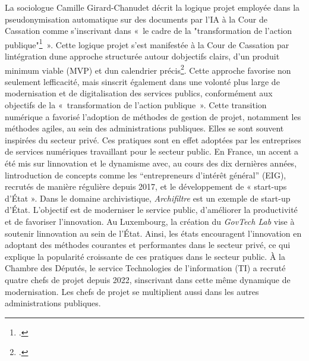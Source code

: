  La sociologue Camille Girard-Chanudet décrit la logique projet employée dans
la pseudonymisation automatique sur des documents par l'IA à la Cour de
Cassation comme s'inscrivant dans «~le cadre de la "transformation de
l'action publique"\footcite{girard-chanudet_travail_2023}~». Cette logique projet s'est
manifestée à la Cour de Cassation par l\textquotesingle intégration
d\textquotesingle une approche structurée autour
d\textquotesingle objectifs clairs, d'un produit minimum viable (MVP) et
d\textquotesingle un calendrier précis\footcite{girard-chanudet_travail_2023}. Cette
approche favorise non seulement l\textquotesingle efficacité, mais
s\textquotesingle inscrit également dans une volonté plus large de
modernisation et de digitalisation des services publics, conformément
aux objectifs de la «~transformation de l'action publique~». Cette
transition numérique a favorisé l'adoption de méthodes de gestion de
projet, notamment les méthodes agiles, au sein des administrations
publiques. Elles se sont souvent inspirées du secteur privé. Ces pratiques sont en effet
adoptées par les entreprises de services numériques travaillant pour le
secteur public. En France, un accent a été mis sur
l\textquotesingle innovation et le dynamisme avec, au cours des dix dernières années,
l\textquotesingle introduction de concepts comme les \enquote{entrepreneurs
d'intérêt général} (EIG), recrutés de manière régulière depuis 2017, et le
développement de « start-ups d'État ».
Dans le domaine archivistique, \emph{Archifiltre} est un exemple de
start-up d'État. L'objectif est de moderniser le service public,
d'améliorer la productivité et de favoriser l'innovation. Au Luxembourg,
la création du \emph{GovTech Lab} vise à soutenir
l\textquotesingle innovation au sein de l'État. Ainsi, les états
encouragent l'innovation en adoptant des méthodes courantes et
performantes dans le secteur privé, ce qui explique la popularité
croissante de ces pratiques dans le secteur public. À la Chambre des
Députés, le service Technologies de l'information (TI) a recruté quatre chefs
de projet depuis 2022, s\textquotesingle inscrivant dans cette même
dynamique de modernisation. Les chefs de projet se multiplient aussi
dans les autres administrations publiques.\newline

